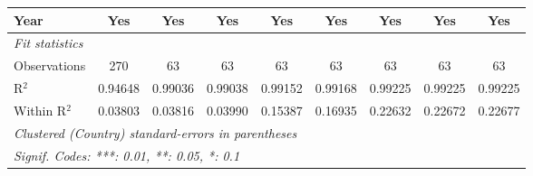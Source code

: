 \begin{table}[htbp]
\begin{tabular}{lcccccccc}
      Year                                                      & Yes             & Yes      & Yes      & Yes          & Yes          & Yes          & Yes          & Yes\\  
      \midrule
      \emph{Fit statistics}\\
      Observations                                              & 270             & 63       & 63       & 63           & 63           & 63           & 63           & 63\\  
      R$^2$                                                     & 0.94648         & 0.99036  & 0.99038  & 0.99152      & 0.99168      & 0.99225      & 0.99225      & 0.99225\\  
      Within R$^2$                                              & 0.03803         & 0.03816  & 0.03990  & 0.15387      & 0.16935      & 0.22632      & 0.22672      & 0.22677\\  
      \midrule \midrule
      \multicolumn{9}{l}{\emph{Clustered (Country) standard-errors in parentheses}}\\
      \multicolumn{9}{l}{\emph{Signif. Codes: ***: 0.01, **: 0.05, *: 0.1}}\\
   \end{tabular}
\end{table}


